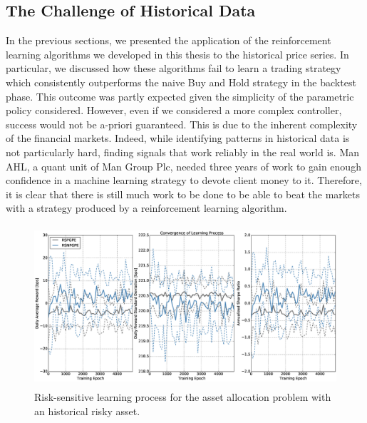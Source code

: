\subsection{The Challenge of Historical Data}
In the previous sections, we presented the application of the reinforcement learning algorithms we developed in this thesis to the historical price series. In particular, we discussed how these algorithms fail to learn a trading strategy which consistently outperforms the naive Buy and Hold strategy in the backtest phase. This outcome was partly expected given the simplicity of the parametric policy considered. However, even if we considered a more complex controller, success would not be a-priori guaranteed. This is due to the inherent complexity of the financial markets. Indeed, while identifying patterns in historical data is not particularly hard, finding signals that work reliably in the real world is. Man AHL, a quant unit of Man Group Plc, needed three years of work to gain enough confidence in a machine learning strategy to devote client money to it. Therefore, it is clear that there is still much work to be done to be able to beat the markets with a strategy produced by a reinforcement learning algorithm. 

\begin{figure}[t!]
	\centering
	\includegraphics[height=6cm,width=1.0\textwidth]{Images/8_10_single_hist_sensitive_convergence}
	\caption[Risk-sensitive learning process for the historical risky asset.]{Risk-sensitive learning process for the asset allocation problem with an historical risky asset.}
	\label{fig:8_10_rs_learning_process_historical}
\end{figure}

